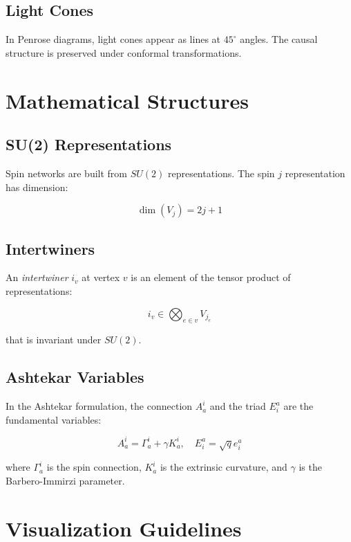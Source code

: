 \documentclass[12pt,a4paper]{article}
\begin{document}
\subsection{Light Cones}

In Penrose diagrams, light cones appear as lines at $45^\circ$ angles. The causal structure is preserved under conformal transformations.

\section{Mathematical Structures}

\subsection{SU(2) Representations}

Spin networks are built from $SU(2)$ representations. The spin $j$ representation has dimension:

\begin{equation}
\dim(V_j) = 2j + 1
\end{equation}

\subsection{Intertwiners}

An \textit{intertwiner} $i_v$ at vertex $v$ is an element of the tensor product of representations:

\begin{equation}
i_v \in \bigotimes_{e \in v} V_{j_e}
\end{equation}

that is invariant under $SU(2)$.

\subsection{Ashtekar Variables}

In the Ashtekar formulation, the connection $A_a^i$ and the triad $E_i^a$ are the fundamental variables:

\begin{equation}
A_a^i = \Gamma_a^i + \gamma K_a^i, \quad E_i^a = \sqrt{q} e_i^a
\end{equation}

where $\Gamma_a^i$ is the spin connection, $K_a^i$ is the extrinsic curvature, and $\gamma$ is the Barbero-Immirzi parameter.

\section{Visualization Guidelines}
\end{document}
